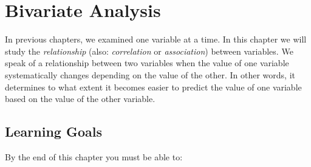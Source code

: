 \chapter{Bivariate Analysis}
\label{ch:bivariate-analysis}

In previous chapters, we examined one variable at a time. In this chapter we will study the \emph{relationship} (also: \emph{correlation} or \emph{association}) between variables. We speak of a relationship between two variables when the value of one variable systematically changes depending on the value of the other. In other words, it determines to what extent it becomes easier to predict the value of one variable based on the value of the other variable.

\section{Learning Goals}
\label{sec:bivariate-analysis-learning-goals}

By the end of this chapter you must be able to:

